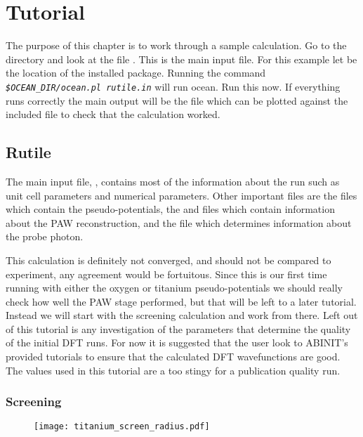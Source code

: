 \documentclass[11pt]{report}
\begin{document}
\chapter{Tutorial}

The purpose of this chapter is to work through a sample  calculation. Go to the  directory and look at the file . This is the main input file. For this example let  be the location of the installed  package. Running the command \texttt{\textsl{\$OCEAN\_DIR/ocean.pl rutile.in}} will run ocean. Run this now. If everything runs correctly the main output will be the file  which can be plotted against the included  file to check that the calculation worked.

\section{Rutile}

The main input file, , contains most of the information about the run such as unit cell parameters and numerical parameters. Other important files are the  files which contain the pseudo-potentials, the  and  files which contain information about the PAW reconstruction, and the  file which determines information about the probe photon. 

This calculation is definitely not converged, and should not be compared to experiment, any agreement would be fortuitous. Since this is our first time running with either the oxygen or titanium pseudo-potentials we should really check how well the PAW stage performed, but that will be left to a later tutorial. Instead we will start with the screening calculation and work from there. Left out of this tutorial is any investigation of the parameters that determine the quality of the initial DFT runs. For now it is suggested that the user look to ABINIT's provided tutorials to ensure that the calculated DFT wavefunctions are good. The values used in this tutorial are a too stingy for a publication quality run.

\subsection{Screening}

\begin{figure}
\texttt{[image: titanium\_screen\_radius.pdf]}
\label{titanium_screen_radius}
\end{figure}
\end{document}
